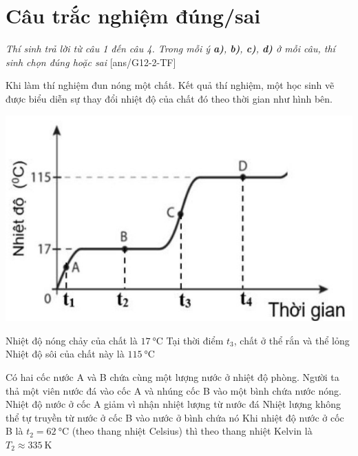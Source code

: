 \section{Câu trắc nghiệm đúng/sai} 
\textit{Thí sinh trả lời từ câu 1 đến câu 4. Trong mỗi ý \textbf{a)}, \textbf{b)}, \textbf{c)}, \textbf{d)} ở mỗi câu, thí sinh chọn đúng hoặc sai}
\setcounter{ex}{0}
[ans/G12-2-TF]
\begin{ex}
	Khi làm thí nghiệm đun nóng một chất. Kết quả thí nghiệm, một học sinh vẽ được biểu diễn sự thay đổi nhiệt độ của chất đó theo thời gian như hình bên.
	\begin{center}
		\includegraphics[width=0.4\linewidth]{../figs/D12-1-3}
	\end{center}
	{\True Nhiệt độ nóng chảy của chất là $\SI{17}{\celsius}$}
	{Tại thời điểm $t_{3}$, chất ở thể rắn và thể lỏng}
	{\True Nhiệt độ sôi của chất này là $\SI{115}{\celsius}$}
	\loigiai{}
\end{ex}
\begin{ex}
	Có hai cốc nước A và B chứa cùng một lượng nước ở nhiệt độ phòng. Người ta thả một viên nước đá vào cốc A và nhúng cốc B vào một bình chứa nước nóng.
	{Nhiệt độ nước ở cốc A giảm vì nhận nhiệt lượng từ nước đá}
	{Nhiệt lượng không thể tự truyền từ nước ở cốc B vào nước ở bình chứa nó}
	{\True Khi nhiệt độ nước ở cốc B là $t_{2}=\SI{62}{\celsius}$ (theo thang nhiệt Celsius) thì theo thang nhiệt Kelvin là $T_{2} \approx \SI{335}{\kelvin}$}
	\loigiai{}
\end{ex}
